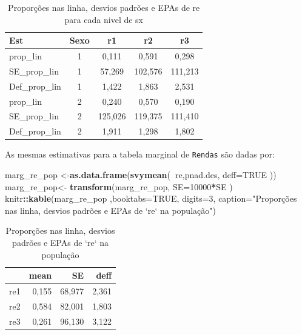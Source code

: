 \documentclass[]{book}
\newenvironment{Shaded}{\begin{snugshade}}{\end{snugshade}}
\newcommand{\KeywordTok}[1]{\textcolor[rgb]{0.13,0.29,0.53}{\textbf{#1}}}
\newcommand{\DataTypeTok}[1]{\textcolor[rgb]{0.13,0.29,0.53}{#1}}
\newcommand{\DecValTok}[1]{\textcolor[rgb]{0.00,0.00,0.81}{#1}}
\newcommand{\StringTok}[1]{\textcolor[rgb]{0.31,0.60,0.02}{#1}}
\newcommand{\OtherTok}[1]{\textcolor[rgb]{0.56,0.35,0.01}{#1}}
\newcommand{\OperatorTok}[1]{\textcolor[rgb]{0.81,0.36,0.00}{\textbf{#1}}}
\newcommand{\NormalTok}[1]{#1}
\theoremstyle{definition}
\theoremstyle{definition}
\theoremstyle{definition}
\theoremstyle{remark}
\begin{document}
\begin{table}

\caption{\label{tab:proplinha}Proporções nas linha, desvios padrões e EPAs de re para cada nivel de sx}
\centering
\begin{tabular}[t]{lcccc}
\toprule
Est & Sexo & r1 & r2 & r3\\
\midrule
prop\_lin & 1 & 0,111 & 0,591 & 0,298\\
SE\_prop\_lin & 1 & 57,269 & 102,576 & 111,213\\
Def\_prop\_lin & 1 & 1,422 & 1,863 & 2,531\\
prop\_lin & 2 & 0,240 & 0,570 & 0,190\\
SE\_prop\_lin & 2 & 125,026 & 119,375 & 111,410\\
Def\_prop\_lin & 2 & 1,911 & 1,298 & 1,802\\
\bottomrule
\end{tabular}
\end{table}

As mesmas estimativas para a tabela marginal de \texttt{Rendas} são
dadas por:

\begin{Shaded}
\begin{Highlighting}[]
\NormalTok{marg_re_pop <-}\KeywordTok{as.data.frame}\NormalTok{(}\KeywordTok{svymean}\NormalTok{(}\OperatorTok{~}\NormalTok{re,pnad.des, }\DataTypeTok{deff=}\OtherTok{TRUE}\NormalTok{ ))}
\NormalTok{marg_re_pop<-}\StringTok{ }\KeywordTok{transform}\NormalTok{(marg_re_pop, }\DataTypeTok{SE=}\DecValTok{10000}\OperatorTok{*}\NormalTok{SE )}
\NormalTok{knitr}\OperatorTok{::}\KeywordTok{kable}\NormalTok{(marg_re_pop ,}\DataTypeTok{booktabs=}\OtherTok{TRUE}\NormalTok{, }\DataTypeTok{digits=}\DecValTok{3}\NormalTok{,}
  \DataTypeTok{caption=}\StringTok{"Proporções nas linha, desvios padrões e EPAs de `re` na população"}\NormalTok{)}
\end{Highlighting}
\end{Shaded}

\begin{table}

\caption{\label{tab:unnamed-chunk-2}Proporções nas linha, desvios padrões e EPAs de `re` na população}
\centering
\begin{tabular}[t]{lrrr}
\toprule
  & mean & SE & deff\\
\midrule
re1 & 0,155 & 68,977 & 2,361\\
re2 & 0,584 & 82,001 & 1,803\\
re3 & 0,261 & 96,130 & 3,122\\
\bottomrule
\end{tabular}
\end{table}
\end{document}
